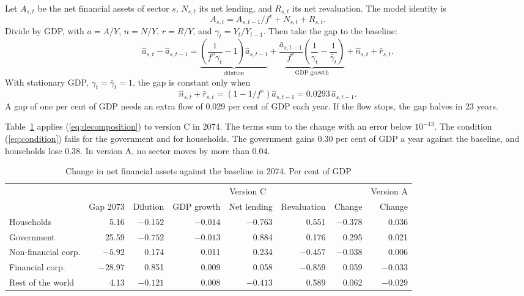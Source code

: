\documentclass[11pt,a4paper]{article}
\begin{document}
Let $A_{s,t}$ be the net financial assets of sector $s$, $N_{s,t}$ its net lending, and $R_{s,t}$ its net revaluation. The model identity is
\begin{equation}
A_{s,t} = A_{s,t-1}/f^v + N_{s,t} + R_{s,t} .
\end{equation}
Divide by GDP, with $a = A/Y$, $n = N/Y$, $r = R/Y$, and $\gamma_t = Y_t/Y_{t-1}$. Then take the gap to the baseline:
\begin{equation}
\hat{a}_{s,t} - \hat{a}_{s,t-1} =
\underbrace{\left( \frac{1}{f^v \gamma_t} - 1 \right) \hat{a}_{s,t-1}}_{\text{dilution}}
+ \underbrace{\frac{\bar{a}_{s,t-1}}{f^v} \left( \frac{1}{\gamma_t} - \frac{1}{\bar{\gamma}_t} \right)}_{\text{GDP growth}}
+ \hat{n}_{s,t} + \hat{r}_{s,t} .
\label{eq:decomposition}
\end{equation}
With stationary GDP, $\gamma_t = \bar{\gamma}_t = 1$, the gap is constant only when
\begin{equation}
\hat{n}_{s,t} + \hat{r}_{s,t} = \left( 1 - 1/f^v \right) \hat{a}_{s,t-1} = 0.0293\, \hat{a}_{s,t-1} .
\label{eq:condition}
\end{equation}
A gap of one per cent of GDP needs an extra flow of 0.029 per cent of GDP each year. If the flow stops, the gap halves in 23 years.

Table~\ref{tab:decomposition} applies (\ref{eq:decomposition}) to version C in 2074. The terms sum to the change with an error below $10^{-13}$.
The condition (\ref{eq:condition}) fails for the government and for households.
The government gains 0.30 per cent of GDP a year against the baseline, and households lose 0.38.
In version A, no sector moves by more than 0.04.

\begin{table}[ht]
\centering
\small
\caption{Change in net financial assets against the baseline in 2074. Per cent of GDP}
\label{tab:decomposition}
\setlength{\tabcolsep}{4pt}
\begin{tabular}{@{}lrrrrrrr@{}}
\toprule
 & & \multicolumn{5}{c}{Version C} & Version A \\
\cmidrule(lr){3-7}\cmidrule(l){8-8}
 & Gap 2073 & Dilution & GDP growth & Net lending & Revaluation & Change & Change \\
\midrule
Households & 5.16 & $-0.152$ & $-0.014$ & $-0.763$ & 0.551 & $-0.378$ & 0.036 \\
Government & 25.59 & $-0.752$ & $-0.013$ & 0.884 & 0.176 & 0.295 & 0.021 \\
Non-financial corp. & $-5.92$ & 0.174 & 0.011 & 0.234 & $-0.457$ & $-0.038$ & 0.006 \\
Financial corp. & $-28.97$ & 0.851 & 0.009 & 0.058 & $-0.859$ & 0.059 & $-0.033$ \\
Rest of the world & 4.13 & $-0.121$ & 0.008 & $-0.413$ & 0.589 & 0.062 & $-0.029$ \\
\bottomrule
\end{tabular}
\end{table}
\end{document}
